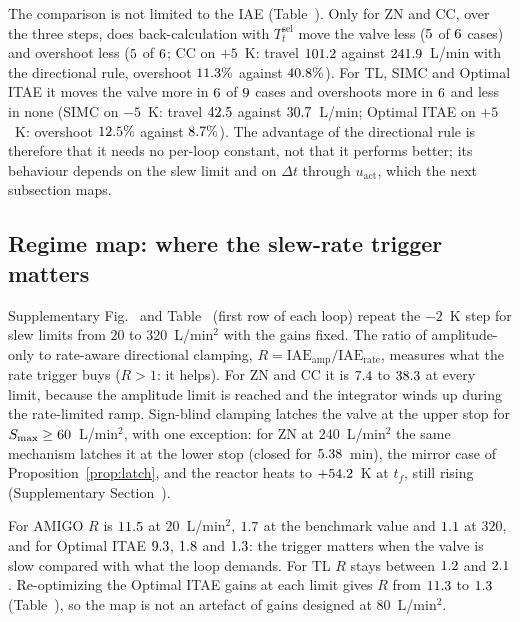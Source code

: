 The comparison is not limited to the IAE (Table~). Only for ZN and CC, over the three steps, does back-calculation with $T_t^{\mathrm{sel}}$ move the valve less ($5$ of $6$ cases) and overshoot less ($5$ of $6$; CC on $+5$~K: travel $101.2$ against $241.9$~L/min with the directional rule, overshoot $11.3\%$ against $40.8\%$). For TL, SIMC and Optimal ITAE it moves the valve more in $6$ of $9$ cases and overshoots more in $6$ and less in none (SIMC on $-5$~K: travel $42.5$ against $30.7$~L/min; Optimal ITAE on $+5$~K: overshoot $12.5\%$ against $8.7\%$). The advantage of the directional rule is therefore that it needs no per-loop constant, not that it performs better; its behaviour depends on the slew limit and on $\Delta t$ through $u_{\text{act}}$, which the next subsection maps.



\subsection{Regime map: where the slew-rate trigger matters}
\label{subsec:regime}
Supplementary Fig.~ and Table~ (first row of each loop) repeat the $-2$~K step for slew limits from $20$ to $320$~L/min$^2$ with the gains fixed. The ratio of amplitude-only to rate-aware directional clamping, $R = \mathrm{IAE}_{\mathrm{amp}}/\allowbreak\mathrm{IAE}_{\mathrm{rate}}$, measures what the rate trigger buys ($R > 1$: it helps). For ZN and CC it is $7.4$ to $38.3$ at every limit, because the amplitude limit is reached and the integrator winds up during the rate-limited ramp. Sign-blind clamping latches the valve at the upper stop for $S_{\max} \ge 60$~L/min$^2$, with one exception: for ZN at $240$~L/min$^2$ the same mechanism latches it at the lower stop (closed for $5.38$~min), the mirror case of Proposition~\ref{prop:latch}, and the reactor heats to $+54.2$~K at $t_f$, still rising (Supplementary Section~).

For AMIGO $R$ is $11.5$ at $20$~L/min$^2$, $1.7$ at the benchmark value and $1.1$ at $320$, and for Optimal ITAE $9.3$, $1.8$ and $1.3$: the trigger matters when the valve is slow compared with what the loop demands. For TL $R$ stays between $1.2$ and $2.1$. Re-optimizing the Optimal ITAE gains at each limit gives $R$ from $11.3$ to $1.3$ (Table~), so the map is not an artefact of gains designed at $80$~L/min$^2$.

